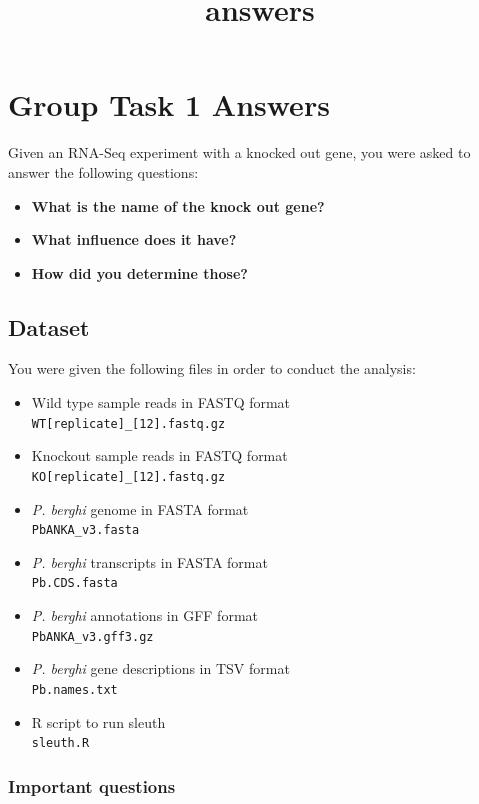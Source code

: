 \documentclass[11pt]{article}
\title{answers}
\begin{document}
    \section{Group Task 1 Answers}\label{group-task-1-answers}

Given an RNA-Seq experiment with a knocked out gene, you were asked to
answer the following questions:

\begin{itemize}
\item
  \textbf{What is the name of the knock out gene?}
\item
  \textbf{What influence does it have?}
\item
  \textbf{How did you determine those?}
\end{itemize}

    \subsection{Dataset}\label{dataset}

You were given the following files in order to conduct the analysis:

\begin{itemize}
\item
  Wild type sample reads in FASTQ format\\
  \texttt{WT{[}replicate{]}\_{[}1\textbar{}2{]}.fastq.gz}
\item
  Knockout sample reads in FASTQ format\\
  \texttt{KO{[}replicate{]}\_{[}1\textbar{}2{]}.fastq.gz}
\item
  \textit{P. berghi} genome in FASTA format\\
  \texttt{PbANKA\_v3.fasta}
\item
  \textit{P. berghi} transcripts in FASTA format\\
  \texttt{Pb.CDS.fasta}
\item
  \textit{P. berghi} annotations in GFF format\\
  \texttt{PbANKA\_v3.gff3.gz}
\item
  \textit{P. berghi} gene descriptions in TSV format\\
  \texttt{Pb.names.txt}
\item
  R script to run sleuth\\
  \texttt{sleuth.R}
\end{itemize}

\newpage

\subsubsection{Important questions}\label{important-questions}
\end{document}
